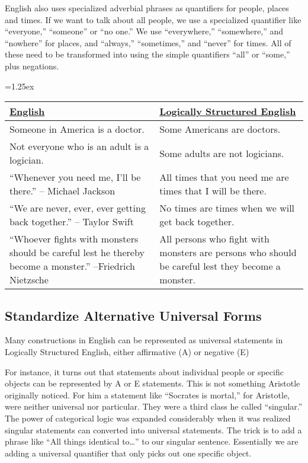 English also uses specialized adverbial phrases as quantifiers for people, places and times. If we want to talk about all people, we use a specialized quantifier like ``everyone,'' ``someone'' or ``no one.'' We use ``everywhere,'' ``somewhere,'' and ``nowhere'' for places, and ``always,'' ``sometimes,'' and ``never'' for times.  All of these need to be transformed into using the simple quantifiers ``all'' or ``some,'' plus negations.

\begin{table*}
\tabulinesep=1.25ex
\begin{longtabu}{p{.5\linewidth}p{.5\linewidth}}
\underline{English} &
\underline{Logically Structured English} \\
\endhead
Someone in America is a doctor. &
Some Americans are doctors. \\

Not everyone who is an adult is a logician. &
Some adults are not logicians. \\

``Whenever you need me, I'll be there.'' -- Michael Jackson &
All times that you need me are times that I will be there. \\

``We are never, ever, ever getting back together.'' -- Taylor Swift &
No times are times when we will get back together.\\

``Whoever fights with monsters should be careful lest he thereby become a monster.'' --Friedrich Nietzsche &
All persons who fight with monsters are persons who should be careful lest they become a monster.\\

\end{longtabu}
\end{table*}

\subsection{Standardize Alternative Universal Forms}
\label{subsec:alternative_universals}

Many constructions in English can be represented as universal statements in Logically Structured English, either affirmative (A) or negative (E)

For instance, it turns out that statements about individual people or specific objects can be represented by A or E statements. This is not something Aristotle originally noticed. For him a statement like ``Socrates is mortal,'' for Aristotle, were neither universal nor particular. They were a third class he called ``singular.'' The power of categorical logic was expanded considerably when it was realized singular statements can converted into universal statements. The trick is to add a phrase like ``All things identical to\ldots'' to our singular sentence. Essentially we are adding a universal quantifier that only picks out one specific object.

